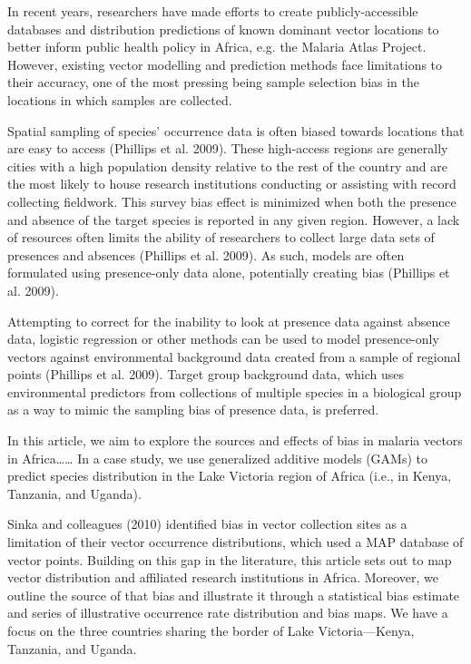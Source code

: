 \documentclass[sn-nature]{sn-jnl}%
\begin{document}
In recent years, researchers have made efforts to create publicly-accessible databases and distribution predictions of known dominant vector locations to better inform public health policy in Africa, e.g. the Malaria Atlas Project. However, existing vector modelling and prediction methods face limitations to their accuracy, one of the most pressing being sample selection bias in the locations in which samples are collected. 

Spatial sampling of species' occurrence data is often biased towards locations that are easy to access (Phillips et al. 2009). These high-access regions are generally cities with a high population density relative to the rest of the country and are the most likely to house research institutions conducting or assisting with record collecting fieldwork. This survey bias effect is minimized when both the presence and absence of the target species is reported in any given region. However, a lack of resources often limits the ability of researchers to collect large data sets of presences and absences (Phillips et al. 2009). As such, models are often formulated using presence-only data alone, potentially creating bias (Phillips et al. 2009). 

Attempting to correct for the inability to look at presence data against absence data, logistic regression or other methods can be used to model presence-only vectors against environmental background data created from a sample of regional points (Phillips et al. 2009). Target group background data, which uses environmental predictors from collections of multiple species in a biological group as a way to mimic the sampling bias of presence data, is preferred. 

In this article, we aim to explore the sources and effects of bias in malaria vectors in Africa…… In a case study, we use generalized additive models (GAMs) to predict species distribution in the Lake Victoria region of Africa (i.e., in Kenya, Tanzania, and Uganda).

Sinka and colleagues (2010) identified bias in vector collection sites as a limitation of their vector occurrence distributions, which used a MAP database of vector points. Building on this gap in the literature, this article sets out to map vector distribution and affiliated research institutions in Africa. Moreover, we outline the source of that bias and illustrate it through a statistical bias estimate and series of illustrative occurrence rate distribution and bias maps. We have a focus on the three countries sharing the border of Lake Victoria—Kenya, Tanzania, and Uganda. 
\end{document}
